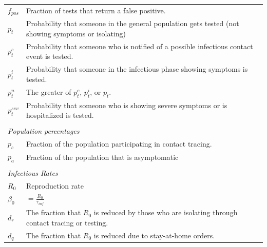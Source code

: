 \documentclass[notitlepage, superscriptaddress]{revtex4-2}
\begin{document}
\begin{table}[]
\begin{tabular}{ll}
$f_{pos}$                   & Fraction of tests that return a false positive.                                                    \\
$p_t$                       & Probability that someone in the general population gets tested (not showing symptoms or isolating) \\
$p^{c}_{t}$                 & Probability that someone who is notified of a possible infectious contact event is tested.         \\
$p^{i}_{t}$                 & Probability that someone in the infectious phase showing symptoms is tested.                       \\
$p^{n}_{t}$                 & The greater of $p^{c}_{t}$, $p^{i}_{t}$, or $p_{t}$.                                               \\
$p^{sev}_{t}$               & Probability that someone who is showing severe symptoms or is hospitalized is tested.              \\
                            &                                                                                                    \\
\multicolumn{2}{l}{\textit{Population percentages}}                                                                              \\
$p_{c}$                     & Fraction of the population participating in contact tracing.                                       \\
$p_{a}$                     & Fraction of the population that is asymptomatic                                                    \\
                            &                                                                                                    \\
\multicolumn{2}{l}{\textit{Infectious Rates}}                                                                                    \\
$R_{0}$                     & Reproduction rate                                                                                  \\
$\beta_{0}$                 & $= \frac{R_{0}}{\tau_{inf}}$                                                                         \\
$d_{r}$             & The fraction that $R_{0}$ is reduced by those who are isolating through contact tracing or testing.      \\
$d_{q}$                     & The fraction that $R_{0}$ is reduced due to stay-at-home orders.                                   \\

\end{tabular}
\end{table}
\end{document}

